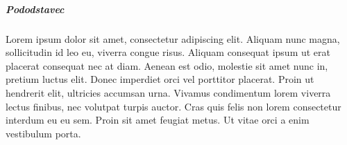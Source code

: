 \subparagraph{Pododstavec}
Lorem ipsum dolor sit amet, consectetur adipiscing elit.
Aliquam nunc magna, sollicitudin id leo eu, viverra congue risus.
Aliquam consequat ipsum ut erat placerat consequat nec at diam. 
Aenean est odio, molestie sit amet nunc in, pretium luctus elit. 
Donec imperdiet orci vel porttitor placerat. 
Proin ut hendrerit elit, ultricies accumsan urna. 
Vivamus condimentum lorem viverra lectus finibus, nec volutpat turpis auctor.
Cras quis felis non lorem consectetur interdum eu eu sem. 
Proin sit amet feugiat metus. 
Ut vitae orci a enim vestibulum porta. 

\newpage